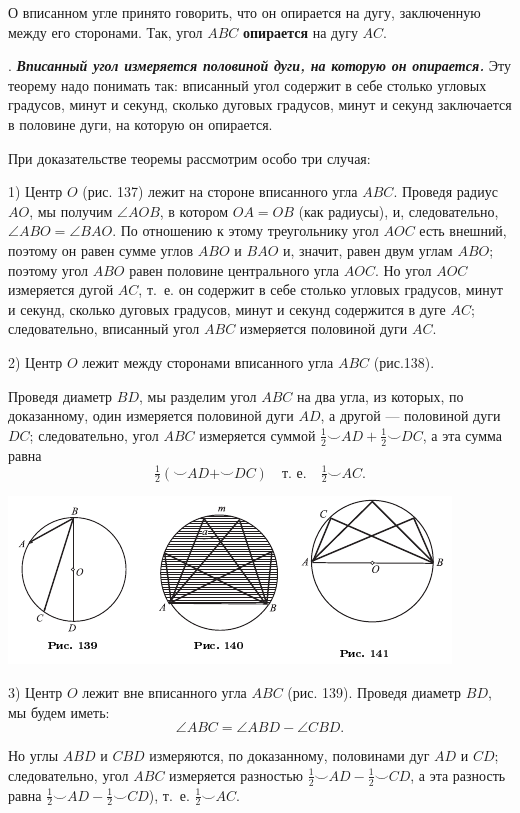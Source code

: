 \documentclass[oneside]{book}
\begin{document}
О вписанном угле принято говорить, что он опирается на дугу, заключенную между его сторонами.
Так, угол $ABC$ \textbf{опирается} на дугу $AC$.

.
\textbf{\emph{Вписанный угол измеряется половиной дуги, на которую он опирается.}}
Эту теорему надо понимать так:
вписанный угол содержит в себе столько угловых градусов, минут и секунд, сколько дуговых градусов, минут и секунд заключается в половине дуги, на которую он опирается.

При доказательстве теоремы рассмотрим особо три случая:

1) Центр $O$ (рис. 137) лежит на стороне вписанного угла $ABC$.
Проведя радиус $AO$, мы получим $\angle AOB$, в котором $OA = OB$ (как радиусы), и, следовательно, $\angle ABO=\angle BAO$.
По отношению к этому треугольнику угол $AOC$ есть внешний, поэтому он равен сумме углов $ABO$ и $BAO$ и, значит, равен двум углам $ABO$;
поэтому угол $ABO$ равен половине центрального угла $AOC$.
Но угол $AOC$ измеряется дугой $AC$, т.~е.
он содержит в себе столько угловых градусов, минут и секунд, сколько дуговых градусов, минут и секунд содержится в дуге $AC$;
следовательно, вписанный угол $ABC$ измеряется половиной дуги $AC$.

2) Центр $O$ лежит между сторонами вписанного угла $ABC$ (рис.138).

Проведя диаметр $BD$, мы разделим угол $ABC$ на два угла, из которых, по доказанному, один измеряется половиной дуги $AD$, а другой — половиной дуги $DC$;
следовательно, угол $ABC$ измеряется суммой
$\tfrac12{\smallsmile}AD+\tfrac12{\smallsmile}DC$, а эта сумма равна 
\[\tfrac12({\smallsmile}AD+{\smallsmile}DC)
\quad
\text{т.~е.}
\quad
\tfrac12{\smallsmile}AC.
\]

\includegraphics{pics/ris-139-141}

3) Центр $O$ лежит вне вписанного угла $ABC$ (рис. 139).
Проведя диаметр $BD$, мы будем иметь:
\[\angle ABC=\angle ABD-\angle CBD.\]

Но углы $ABD$ и $CBD$ измеряются, по доказанному, половинами дуг $AD$ и $CD$;
следовательно, угол $ABC$ измеряется разностью
$\tfrac12{\smallsmile}AD-\tfrac12{\smallsmile}CD$, а эта разность равна $\tfrac12{\smallsmile}AD-\tfrac12{\smallsmile}CD$), т.~е.
$\tfrac12{\smallsmile}AC$.
\end{document}

